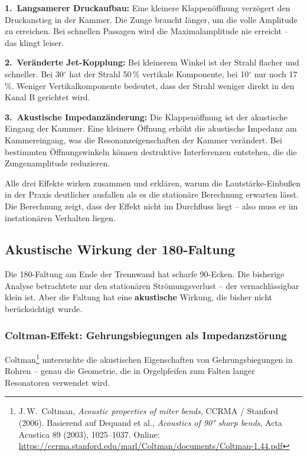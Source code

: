 \documentclass[11pt,a4paper]{article}
\begin{document}
\textbf{1.\ Langsamerer Druckaufbau:} Eine kleinere Klappenöffnung verzögert den Druckanstieg in der Kammer. Die Zunge braucht länger, um die volle Amplitude zu erreichen. Bei schnellen Passagen wird die Maximalamplitude nie erreicht -- das klingt leiser.

\textbf{2.\ Veränderte Jet-Kopplung:} Bei kleinerem Winkel ist der Strahl flacher und schneller. Bei 30${}^\circ$ hat der Strahl 50\,\% vertikale Komponente, bei 10${}^\circ$ nur noch 17\,\%. Weniger Vertikalkomponente bedeutet, dass der Strahl weniger direkt in den Kanal B gerichtet wird.

\textbf{3.\ Akustische Impedanzänderung:} Die Klappenöffnung ist der akustische Eingang der Kammer. Eine kleinere Öffnung erhöht die akustische Impedanz am Kammereingang, was die Resonanzeigenschaften der Kammer verändert. Bei bestimmten Öffnungswinkeln können destruktive Interferenzen entstehen, die die Zungenamplitude reduzieren.

\begin{keybox}
Alle drei Effekte wirken zusammen und erklären, warum die Lautstärke-Einbußen in der Praxis deutlicher ausfallen als es die stationäre Berechnung erwarten lässt. Die Berechnung zeigt, dass der Effekt nicht im Durchfluss liegt -- also muss er im instationären Verhalten liegen.
\end{keybox}

\subsection{Akustische Wirkung der 180\textdegree-Faltung}

Die 180\textdegree{}-Faltung am Ende der Trennwand hat scharfe 90\textdegree{}-Ecken. Die bisherige Analyse betrachtete nur den stationären Strömungsverlust -- der vernachlässigbar klein ist. Aber die Faltung hat eine \textbf{akustische} Wirkung, die bisher nicht berücksichtigt wurde.

\subsubsection{Coltman-Effekt: Gehrungsbiegungen als Impedanzstörung}

Coltman\footnote{J.\,W.\ Coltman, \textit{Acoustic properties of miter bends}, CCRMA / Stanford (2006). Basierend auf Dequand et al., \textit{Acoustics of 90° sharp bends}, Acta Acustica 89 (2003), 1025--1037. Online: \url{https://ccrma.stanford.edu/marl/Coltman/documents/Coltman-1.44.pdf}} untersuchte die akustischen Eigenschaften von Gehrungsbiegungen in Rohren -- genau die Geometrie, die in Orgelpfeifen zum Falten langer Resonatoren verwendet wird.
\end{document}
